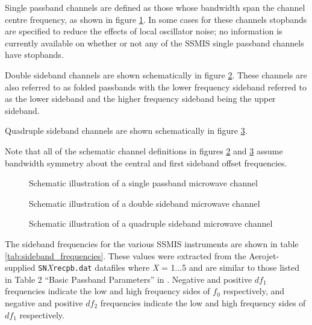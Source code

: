 Single passband channels are defined as those whose bandwidth span the channel centre frequency, as shown in figure \ref{fig:single_passband}. In some cases for these channels stopbands are specified to reduce the effects of local oscillator noise; no information is currently available on whether or not any of the SSMIS single passband channels have stopbands.

Double sideband channels are shown schematically in figure \ref{fig:double_sideband}. These channels are also referred to as folded passbands with the lower frequency sideband referred to as the lower sideband and the higher frequency sideband being the upper sideband.

Quadruple sideband channels are shown schematically in figure \ref{fig:quadruple_sideband}.

Note that all of the schematic channel definitions in figures \ref{fig:double_sideband} and \ref{fig:quadruple_sideband} assume bandwidth symmetry about the central and first sideband offset frequencies.
\begin{figure}[htp]
  \centering
  
  \caption{Schematic illustration of a single passband microwave channel}
  \label{fig:single_passband}
\end{figure}
\begin{figure}[htp]
  \centering
  
  \caption{Schematic illustration of a double sideband microwave channel}
  \label{fig:double_sideband}
\end{figure}
\begin{figure}[htp]
  \centering
  
  \caption{Schematic illustration of a quadruple sideband microwave channel}
  \label{fig:quadruple_sideband}
\end{figure}

The sideband frequencies for the various SSMIS instruments are shown in table \ref{tab:sideband_frequencies}. These values were extracted from the Aerojet-supplied \texttt{SN}\emph{X}\texttt{recpb.dat} datafiles where \emph{X} = 1...5 and are similar to those listed in Table 2 ``Basic Passband Parameters'' in \citep{SSMIS_Passband_Characterization}. Negative and positive $df_1$ frequencies indicate the low and high frequency sides of $f_0$ respectively, and negative and positive $df_2$ frequencies indicate the low and high frequency sides of $df_1$ respectively.

